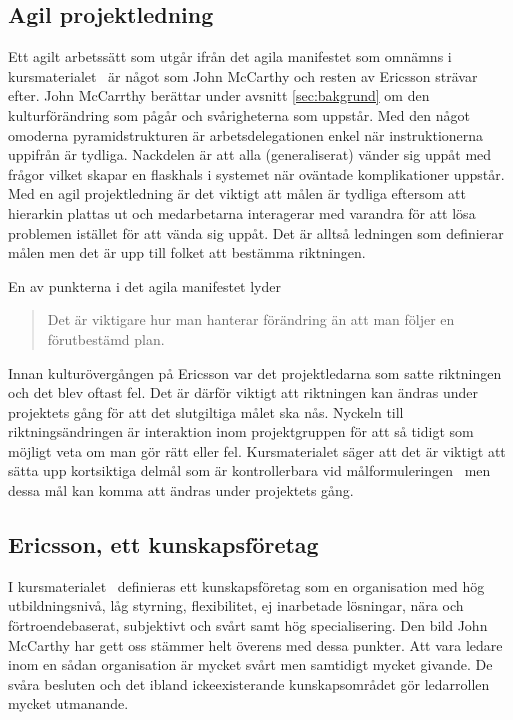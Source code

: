 \subsection{Agil projektledning}
Ett agilt arbetssätt som utgår ifrån det agila manifestet som omnämns i kursmaterialet~\citep{projekt} är något som John McCarthy och resten av Ericsson strävar efter. John McCarrthy berättar under avsnitt \ref{sec:bakgrund} om den kulturförändring som pågår och svårigheterna som uppstår. Med den något omoderna pyramidstrukturen är arbetsdelegationen enkel när instruktionerna uppifrån är tydliga. Nackdelen är att alla (generaliserat) vänder sig uppåt med frågor vilket skapar en flaskhals i systemet när oväntade komplikationer uppstår. Med en agil projektledning är det viktigt att målen är tydliga eftersom att hierarkin plattas ut och medarbetarna interagerar med varandra för att lösa problemen istället för att vända sig uppåt. Det är alltså ledningen som definierar målen men det är upp till folket att bestämma riktningen.

En av punkterna i det agila manifestet lyder
\begin{quote}
Det är viktigare hur man hanterar förändring än att man följer en förutbestämd plan.
\end{quote}
Innan kulturövergången på Ericsson var det projektledarna som satte riktningen och det blev oftast fel. Det är därför viktigt att riktningen kan ändras under projektets gång för att det slutgiltiga målet ska nås. Nyckeln till riktningsändringen är interaktion inom projektgruppen för att så tidigt som möjligt veta om man gör rätt eller fel. Kursmaterialet säger att det är viktigt att sätta upp kortsiktiga delmål som är kontrollerbara vid målformuleringen~\citep{projekt} men dessa mål kan komma att ändras under projektets gång.

\subsection{Ericsson, ett kunskapsföretag}
I kursmaterialet~\citep{teknik} definieras ett kunskapsföretag som en organisation med hög utbildningsnivå, låg styrning, flexibilitet, ej inarbetade lösningar, nära och förtroendebaserat, subjektivt och svårt samt hög specialisering. Den bild John McCarthy har gett oss stämmer helt överens med dessa punkter. Att vara ledare inom en sådan organisation är mycket svårt men samtidigt mycket givande. De svåra besluten och det ibland ickeexisterande kunskapsområdet gör ledarrollen mycket utmanande.